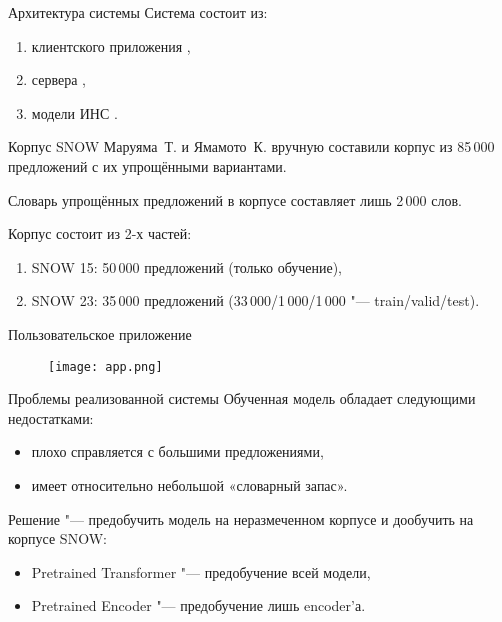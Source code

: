 \begin{frame}[fragile]{Архитектура системы}%
  Система состоит из:
  \begin{enumerate}[1.]%
    \item клиентского приложения ,
    \item сервера ,
    \item модели ИНС .
  \end{enumerate}
\end{frame}


\begin{frame}[fragile]{Корпус SNOW}%
  Маруяма~Т. и Ямамото~К. вручную составили корпус из 85\,000 предложений с их упрощёнными вариантами.

  Словарь упрощённых предложений в корпусе составляет лишь 2\,000 слов.
  
  Корпус состоит из 2-х частей:
  \begin{enumerate}[1.]%
    \item SNOW 15: 50\,000 предложений (только обучение),
    \item SNOW 23: 35\,000 предложений (33\,000/1\,000/1\,000 "--- train/valid/test).
  \end{enumerate}
\end{frame}


\begin{frame}[fragile]{Пользовательское приложение}%
  \begin{figure}[H]%
    \centering
    \texttt{[image: app.png]}
    \label{app-screen}
  \end{figure}
\end{frame}


\begin{frame}[fragile]{Проблемы реализованной системы}%
  Обученная модель обладает следующими недостатками:
  \begin{itemize}%
    \item плохо справляется с большими предложениями,
    \item имеет относительно небольшой «словарный запас».
  \end{itemize}

  Решение "--- предобучить  модель на неразмеченном корпусе и дообучить  на корпусе SNOW:
  \begin{itemize}%
    \item Pretrained Transformer "--- предобучение всей модели,
    \item Pretrained Encoder "--- предобучение лишь encoder'а.
  \end{itemize}
\end{frame}
